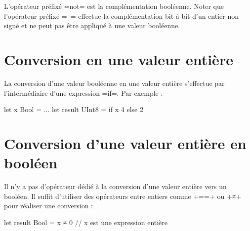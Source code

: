 L'opérateur préfixé \omnibus=not= est la complémentation booléenne. Noter que l'opérateur préfixé \omnibus=~= effectue la complémentation bit-à-bit d'un entier non signé et ne peut pas être appliqué à une valeur booléenne.

\section{Conversion en une valeur entière}

La conversion d'une valeur booléenne en une valeur entière s'effectue par l'intermédiaire d'une expression \omnibus=if=. Par exemple :

\begin{OMNIBUS}
let x Bool = ...
let result UInt8 = if x { 4 }else{ 2 }
\end{OMNIBUS}


\section{Conversion d'une valeur entière en booléen}

Il n'y a pas d'opérateur dédié à la conversion d'une valeur entière vers un booléen. Il suffit d'utiliser des opérateurs entre entiers comme \omnibus+==+ ou \omnibus+≠+ pour réaliser une conversion :

\begin{OMNIBUS}
let result Bool = x ≠ 0 // x est une expression entière
\end{OMNIBUS}



